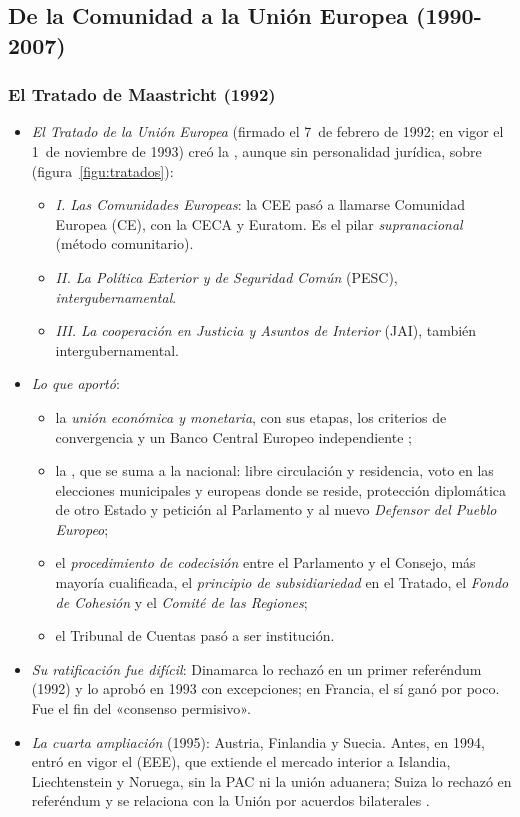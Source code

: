 \documentclass[11pt]{article}
\begin{document}
\subsection{De la Comunidad a la Unión Europea (1990-2007)}\label{sec:reforma}

\subsubsection{El Tratado de Maastricht (1992)}\label{sec:maastricht}

\begin{itemize}
\item \emph{El Tratado de la Unión Europea} (firmado el 7~de febrero de 1992; en vigor el 1~de noviembre de 1993) creó la , aunque sin personalidad jurídica, sobre  (figura~\ref{figu:tratados}):
  \begin{itemize}
  \item \emph{I. Las Comunidades Europeas}: la CEE pasó a llamarse Comunidad Europea (CE), con la CECA y Euratom. Es el pilar \emph{supranacional} (método comunitario).
  \item \emph{II. La Política Exterior y de Seguridad Común} (PESC), \emph{intergubernamental}.
  \item \emph{III. La cooperación en Justicia y Asuntos de Interior} (JAI), también intergubernamental.
  \end{itemize}
\item \emph{Lo que aportó}:
  \begin{itemize}
  \item la \emph{unión económica y monetaria}, con sus etapas, los criterios de convergencia y un Banco Central Europeo independiente ;
  \item la , que se suma a la nacional: libre circulación y residencia, voto en las elecciones municipales y europeas donde se reside, protección diplomática de otro Estado y petición al Parlamento y al nuevo \emph{Defensor del Pueblo Europeo};
  \item el \emph{procedimiento de codecisión} entre el Parlamento y el Consejo, más mayoría cualificada, el \emph{principio de subsidiariedad} en el Tratado, el \emph{Fondo de Cohesión} y el \emph{Comité de las Regiones};
  \item el Tribunal de Cuentas pasó a ser institución.
  \end{itemize}
\item \emph{Su ratificación fue difícil}: Dinamarca lo rechazó en un primer referéndum (1992) y lo aprobó en 1993 con excepciones; en Francia, el sí ganó por poco. Fue el fin del «consenso permisivo».
\item \emph{La cuarta ampliación} (1995): Austria, Finlandia y Suecia. Antes, en 1994, entró en vigor el  (EEE), que extiende el mercado interior a Islandia, Liechtenstein y Noruega, sin la PAC ni la unión aduanera; Suiza lo rechazó en referéndum y se relaciona con la Unión por acuerdos bilaterales .
\end{itemize}
\end{document}

